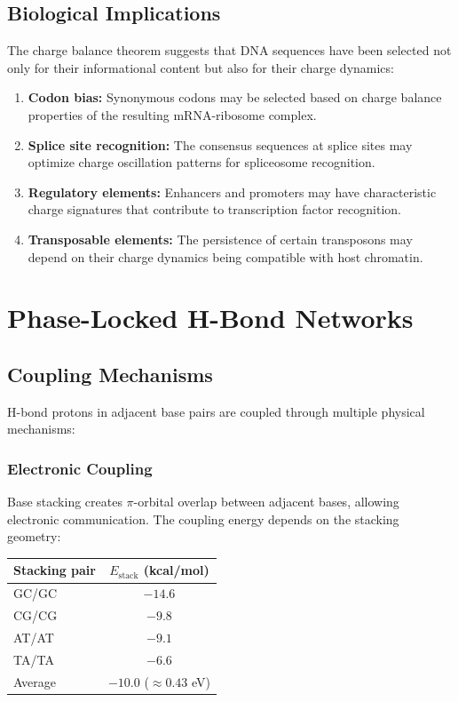 \documentclass[twocolumn,10pt]{article}
\theoremstyle{remark}
\begin{document}
\subsection{Biological Implications}

The charge balance theorem suggests that DNA sequences have been selected not only for their informational content but also for their charge dynamics:

\begin{enumerate}
\item \textbf{Codon bias:} Synonymous codons may be selected based on charge balance properties of the resulting mRNA-ribosome complex.

\item \textbf{Splice site recognition:} The consensus sequences at splice sites may optimize charge oscillation patterns for spliceosome recognition.

\item \textbf{Regulatory elements:} Enhancers and promoters may have characteristic charge signatures that contribute to transcription factor recognition.

\item \textbf{Transposable elements:} The persistence of certain transposons may depend on their charge dynamics being compatible with host chromatin.
\end{enumerate}

\section{Phase-Locked H-Bond Networks}

\subsection{Coupling Mechanisms}

H-bond protons in adjacent base pairs are coupled through multiple physical mechanisms:

\subsubsection{Electronic Coupling}

Base stacking creates $\pi$-orbital overlap between adjacent bases, allowing electronic communication. The coupling energy depends on the stacking geometry:

\begin{center}
\begin{tabular}{lc}
\toprule
Stacking pair & $E_{\mathrm{stack}}$ (kcal/mol) \\
\midrule
GC/GC & $-14.6$ \\
CG/CG & $-9.8$ \\
AT/AT & $-9.1$ \\
TA/TA & $-6.6$ \\
\midrule
Average & $-10.0$ ($\approx 0.43$ eV) \\
\bottomrule
\end{tabular}
\end{center}
\end{document}
